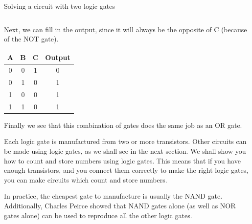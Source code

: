 \begin{wex}{Solving a circuit with two logic gates}
{\begin{center}
\begin{tabular}{|c|c|c|c|}
\end{tabular}
\end{center}
Next, we can fill in the output, since it will always be the opposite of C (because of the NOT gate).
\begin{center}
\begin{tabular}{|c|c|c|c|}\hline
A&B&C&Output\\\hline\hline
0&0&1&0\\\hline
0&1&0&1\\\hline
1&0&0&1\\\hline
1&1&0&1\\\hline
\end{tabular}
\end{center}
Finally we see that this combination of gates does the same job as an OR gate.
}
\end{wex}

Each logic gate is manufactured from two or more transistors.  Other circuits can be made using logic gates, as we shall see in the next section.  We shall show you how to count and store numbers using logic gates.  This means that if you have enough transistors, and you connect them correctly to make the right logic gates, you can make circuits which count and store numbers.

In practice, the cheapest gate to manufacture is usually the NAND gate. Additionally, Charles Peirce showed that NAND gates alone (as well as NOR gates alone) can be used to reproduce all the other logic gates.

